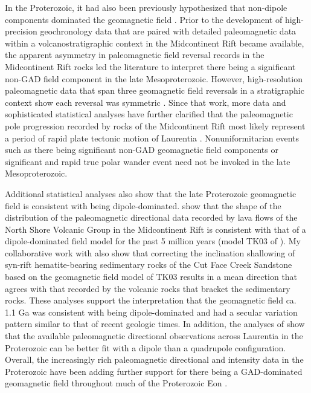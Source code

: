 In the Proterozoic, it had also been previously hypothesized that non-dipole components dominated the geomagnetic field \citep[e.g.][]{Pesonen1981a, Sears2022a}. Prior to the development of high-precision geochronology data that are paired with detailed paleomagnetic data within a volcanostratigraphic context in the Midcontinent Rift became available, the apparent asymmetry in paleomagnetic field reversal records in the Midcontinent Rift rocks led the literature \citep[e.g.][]{Halls1982a, Pesonen1981a} to interpret there being a significant non-GAD field component in the late Mesoproterozoic. However, high-resolution paleomagnetic data that span three geomagnetic field reversals in a stratigraphic context show each reversal was symmetric \citep{Swanson-Hysell2009a}. Since that work, more data and sophisticated statistical analyses have further clarified that the paleomagnetic pole progression recorded by rocks of the Midcontinent Rift most likely represent a period of rapid plate tectonic motion of Laurentia \citep{Swanson-Hysell2019a, Rose2022a}. Nonuniformitarian events such as there being significant non-GAD geomagnetic field components or significant and rapid true polar wander event need not be invoked in the late Mesoproterozoic. 

Additional statistical analyses also show that the late Proterozoic geomagnetic field is consistent with being dipole-dominated. \cite{Tauxe2009a} show that the shape of the distribution of the paleomagnetic directional data recorded by lava flows of the North Shore Volcanic Group in the Midcontinent Rift is consistent with that of a dipole-dominated field model for the past 5 million years (model TK03 of \citealp{Tauxe2004b}). My collaborative work with \cite{Pierce2022a} also show that correcting the inclination shallowing of syn-rift hematite-bearing sedimentary rocks of the Cut Face Creek Sandstone based on the geomagnetic field model of TK03 results in a mean direction that agrees with that recorded by the volcanic rocks that bracket the sedimentary rocks. These analyses support the interpretation that the geomagnetic field ca. 1.1 Ga was consistent with being dipole-dominated and had a secular variation pattern similar to that of recent geologic times. In addition, the analyses of \cite{Gong2023a} show that the available paleomagnetic directional observations across Laurentia in the Proterozoic can be better fit with a dipole than a quadrupole configuration. Overall, the increasingly rich paleomagnetic directional and intensity data in the Proterozoic have been adding further support for there being a GAD-dominated geomagnetic field throughout much of the Proterozoic Eon \citep{Veikkolainen2014a, Salminen2017a, Veikkolainen2021a}. 

